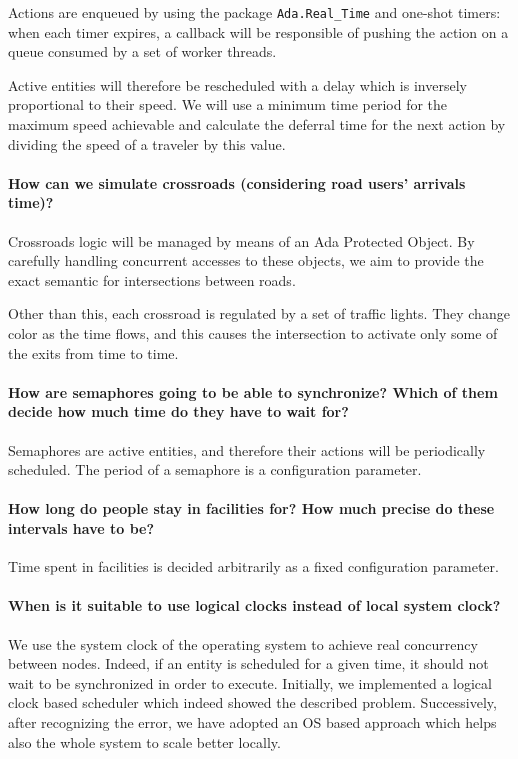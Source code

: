 Actions are enqueued by using the package \texttt{Ada.Real\_Time} and one-shot
timers: when each timer expires, a callback will be responsible of pushing the
action on a queue consumed by a set of worker threads.

Active entities will therefore be rescheduled with a delay which is inversely
proportional to their speed. We will use a minimum time period for the maximum
speed achievable and calculate the deferral time for the next action by
dividing the speed of a traveler by this value.

\paragraph{How can we simulate crossroads (considering road users' arrivals
  time)?}
Crossroads logic will be managed by means of an Ada Protected Object. By
carefully handling concurrent accesses to these objects, we aim to provide the
exact semantic for intersections between roads.

Other than this, each crossroad is regulated by a set of traffic lights. They
change color as the time flows, and this causes the intersection to activate
only some of the exits from time to time.


\paragraph{How are semaphores going to be able to synchronize? Which of them
  decide how much time do they have to wait for?}
Semaphores are active entities, and therefore their actions will be
periodically scheduled.
The period of a semaphore is a configuration parameter.

\paragraph{How long do people stay in facilities for? How much precise do these
  intervals have to be?}
Time spent in facilities is decided arbitrarily as a fixed configuration
parameter.


\paragraph{When is it suitable to use logical clocks instead of local system
  clock?}
We use the system clock of the operating system to
achieve real concurrency between nodes. Indeed, if an entity is scheduled for a
given time, it should not wait to be synchronized
in order to execute. Initially, we implemented a logical clock
based scheduler which indeed showed the described problem.
Successively, after recognizing the error, we have adopted an OS based approach
which helps also the whole system to scale better
locally.
